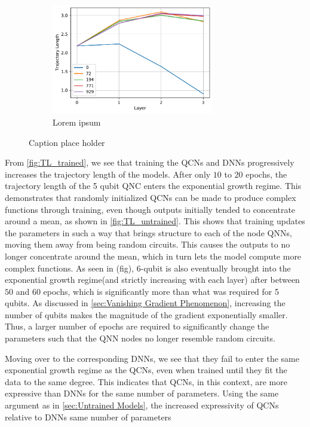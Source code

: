 \begin{figure}[H]
\begin{subfigure}[t]{0.5\textwidth}
    \end{subfigure}%
    \hfill 
    \begin{subfigure}[t]{0.5\textwidth}
        \centering
        \includegraphics[height=1.9in]{latex/figures/TL_trained_DNN_nodes_9.pdf}
        \caption{Lorem ipsum}
    \end{subfigure}
    \caption{Caption place holder}
    \label{fig:TL_trained}
\end{figure}

From \autoref{fig:TL_trained}, we see that training the QCNs and DNNs progressively increases the trajectory length of the models. After only $10$ to $20$ epochs, the trajectory length of the 5 qubit QNC enters the exponential growth regime. This demonstrates that randomly initialized QCNs can be made to produce complex functions through training, even though outputs initially tended to concentrate around a mean, as shown in \autoref{fig:TL_untrained}. This shows that training updates the parameters in such a way that brings structure to each of the node QNNs, moving them away from being random circuits. This causes the outputs to no longer concentrate around the mean, which in turn lets the model compute more complex functions. As seen in (fig), 6-qubit is also eventually brought into the exponential growth regime(and strictly increasing with each layer) after between $50$ and $60$ epochs, which is significantly more than what was required for 5 qubits. As discussed in \autoref{sec:Vanishing Gradient Phenomenon}, increasing the number of qubits makes the magnitude of the gradient exponentially smaller. Thus, a larger number of epochs are required to significantly change the parameters such that the QNN nodes no longer resemble random circuits.

Moving over to the corresponding DNNs, we see that they fail to enter the same exponential growth regime as the QCNs, even when trained until they fit the data to the same degree. This indicates that QCNs, in this context, are more expressive than DNNs for the same number of parameters. Using the same argument as in \autoref{sec:Untrained Models}, the increased expressivity of QCNs relative to DNNs same number of parameters 

